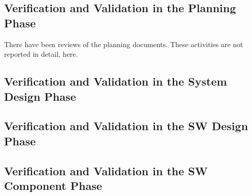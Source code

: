 \documentclass{template/openetcs_article}
\begin{document}
\addtocounter{subsection}{-1}
\subsection{Verification and Validation in the Planning Phase}
\label{sec:vnv-0}

There have been reviews of the planning documents. These activities
are not reported in detail, here.

% 

\subsection{Verification and Validation in the System Design Phase}
\label{sec:vnv-1}




\addtocounter{subsection}{2}





\subsection{Verification and Validation in the SW Design Phase}
\label{sec:vnv-4}


\newpage



\newpage
\subsection{Verification and Validation in the SW Component Phase}
\label{sec:vnv-5}
\end{document}
